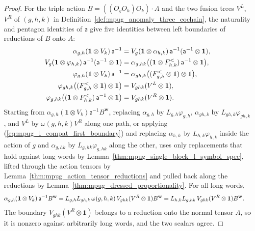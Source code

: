 \begin{proof}\leanok
    For the triple action $B=((O_gO_h)O_k)\cdot A$ and the two fusion trees
    $V^L$, $V^R$ of $(g,h,k)$ in
    Definition~\ref{def:mpug_anomaly_three_cochain}, the naturality and
    pentagon identities of $\mathsf a$ give five identities between left
    boundaries of reductions of $B$ onto $A$:
    \begin{align}
        \alpha_{g,h}(\mathbf 1\otimes V_k)\,\mathsf a^{-1}
         & =V_g(\mathbf 1\otimes\alpha_{h,k})\,\mathsf a^{-1}
        (\mathsf a^{-1}\otimes\mathbf 1),
        \label{eq:mpug_l_compat_first_boundary}               \\
        V_g(\mathbf 1\otimes\varphi_{h,k})\,\mathsf a^{-1}
        (\mathsf a^{-1}\otimes\mathbf 1)
         & =\alpha_{g,hk}
        \bigl((\mathbf 1\otimes F^<_{h,k})\,\mathsf a^{-1}\otimes\mathbf 1\bigr),
        \notag                                                \\
        \varphi_{g,h}(\mathbf 1\otimes V_k)\,\mathsf a^{-1}
         & =\alpha_{gh,k}
        \bigl((F^<_{g,h}\otimes\mathbf 1)\otimes\mathbf 1\bigr),
        \notag                                                \\
        \varphi_{gh,k}\bigl((F^<_{g,h}\otimes\mathbf 1)\otimes\mathbf 1\bigr)
         & =V_{ghk}(V^L\otimes\mathbf 1),
        \notag                                                \\
        \varphi_{g,hk}
        \bigl((\mathbf 1\otimes F^<_{h,k})\,\mathsf a^{-1}\otimes\mathbf 1\bigr)
         & =V_{ghk}(V^R\otimes\mathbf 1).
        \notag
    \end{align}
    Starting from $\alpha_{g,h}(\mathbf 1\otimes V_k)\mathsf a^{-1}B^{\mathbf w}$,
    replacing $\alpha_{g,h}$ by $L_{g,h}\varphi_{g,h}$, $\alpha_{gh,k}$ by
    $L_{gh,k}\varphi_{gh,k}$, and $V^L$ by $\omega(g,h,k)V^R$ along one
    path, or applying (\ref{eq:mpug_l_compat_first_boundary}) and replacing
    $\alpha_{h,k}$ by $L_{h,k}\varphi_{h,k}$ inside the action of $g$ and
    $\alpha_{g,hk}$ by $L_{g,hk}\varphi_{g,hk}$ along the other, uses only
    replacements that hold against long words by
    Lemma~\ref{thm:mpug_single_block_l_symbol_spec}, lifted through the
    action tensors by Lemma~\ref{thm:mpug_action_tensor_reductions} and
    pulled back along the reductions by
    Lemma~\ref{thm:mpug_dressed_proportionality}. For all long words,
    \begin{align}
        \alpha_{g,h}(\mathbf 1\otimes V_k)\,\mathsf a^{-1}B^{\mathbf w}
         & =L_{g,h}L_{gh,k}\,\omega(g,h,k)\,V_{ghk}(V^R\otimes\mathbf 1)
        B^{\mathbf w}
        =L_{h,k}L_{g,hk}\,V_{ghk}(V^R\otimes\mathbf 1)B^{\mathbf w}.
        \notag
    \end{align}
    The boundary $V_{ghk}(V^R\otimes\mathbf 1)$ belongs to a reduction onto
    the normal tensor $A$, so it is nonzero against arbitrarily long words,
    and the two scalars agree.
\end{proof}

